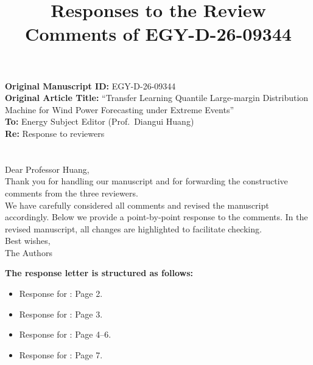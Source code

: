 \documentclass[journal,12pn, onecolumn]{IEEEtran}
\begin{document}

\title{Responses to the Review Comments of EGY-D-26-09344}
\maketitle

\textbf{Original Manuscript ID: }EGY-D-26-09344 \\

\textbf{Original Article Title: }``Transfer Learning Quantile Large-margin Distribution Machine for Wind Power Forecasting under Extreme Events'' \\

\textbf{To: }Energy Subject Editor (Prof.\ Diangui Huang)\\

\textbf{Re: }Response to reviewers\\

\section*{}
{
Dear Professor Huang, \\

Thank you for handling our manuscript and for forwarding the constructive comments from the three reviewers.\\

We have carefully considered all comments and revised the manuscript accordingly. Below we provide a point-by-point response to the comments. In the revised manuscript, all changes are highlighted to facilitate checking.\\

Best wishes,\\

The Authors\\}

\textbf{The response letter is structured as follows:}\\

\begin{itemize}
    \item [$\bullet$]Response for : Page 2.\\
    \item [$\bullet$]Response for : Page 3.\\
    \item [$\bullet$]Response for : Page 4--6.\\
    \item [$\bullet$]Response for : Page 7.\\
\end{itemize}
\end{document}
